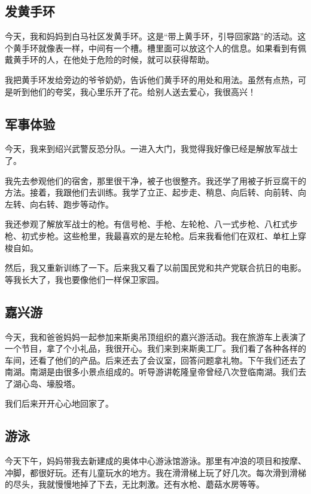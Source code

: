 \documentclass[UTF8,a4paper,titlepage,twoside,10.5pt]{article}
\begin{document}
\subsection{发黄手环}
\label{sec:orgfa30f44}

今天，我和妈妈到白马社区发黄手环。这是“带上黄手环，引导回家路”的活动。这个黄手环就像表一样，中间有一个槽。槽里面可以放这个人的信息。如果看到有佩戴黄手环的人，在他处于危险的时候，就可以获得帮助。

我把黄手环发给旁边的爷爷奶奶，告诉他们黄手环的用处和用法。虽然有点热，可是听到他们的夸奖，我心里乐开了花。给别人送去爱心，我很高兴！

\subsection{军事体验}
\label{sec:org30cb55b}

今天，我来到绍兴武警反恐分队。一进入大门，我觉得我好像已经是解放军战士了。

我先去参观他们的宿舍，那里很干净，被子也很整齐。我还学了用被子折豆腐干的方法。接着，我跟他们去训练。我学了立正、起步走、稍息、向后转、向前转、向左转、向右转、跑步等动作。

我还参观了解放军战士的枪。有信号枪、手枪、左轮枪、八一式步枪、八杠式步枪、初式步枪。这些枪里，我最喜欢的是左轮枪。后来我看他们在双杠、单杠上穿梭自如。

然后，我又重新训练了一下。后来我又看了以前国民党和共产党联合抗日的电影。等我长大了，我也要像他们一样保卫家园。

\subsection{嘉兴游}
\label{sec:org11cfa4f}

今天，我和爸爸妈妈一起参加来斯奥吊顶组织的嘉兴游活动。我在旅游车上表演了一个节目，拿了个小礼品，我很开心。我们来到来斯奥工厂。我们看了各种各样的车间，还看了他们的产品。后来还去了会议室，回答问题拿礼物。下午我们还去了南湖。南湖是由很多小景点组成的。听导游讲乾隆皇帝曾经八次登临南湖。我们去了湖心岛、壕股塔。

我们后来开开心心地回家了。

\subsection{游泳}
\label{sec:org574b020}

今天下午，妈妈带我去新建成的奥体中心游泳馆游泳。那里有冲浪的项目和按摩、冲脚，都很好玩。还有儿童玩水的地方。我在滑滑梯上玩了好几次。每次滑到滑梯的尽头，我就慢慢地掉了下去，无比刺激。还有水枪、蘑菇水房等等。
\end{document}
